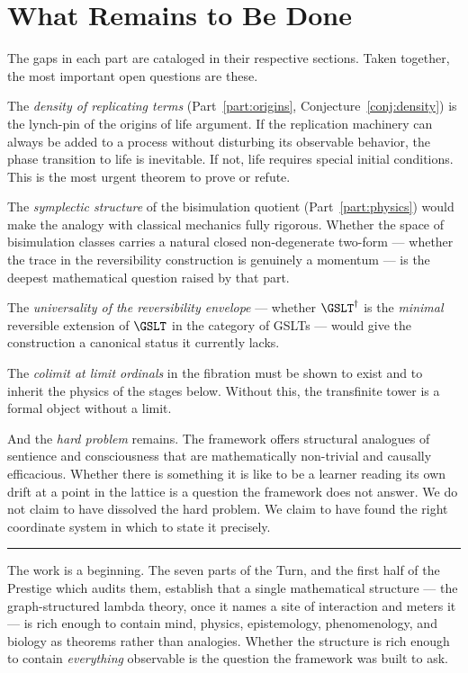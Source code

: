\chapter*{What Remains to Be Done}

The gaps in each part are cataloged in their respective sections.
Taken together, the most important open questions are these.

The \emph{density of replicating terms}
(Part~\ref{part:origins}, Conjecture~\ref{conj:density}) is
the lynch-pin of the origins of life argument.
If the replication machinery can always be added to a process
without disturbing its observable behavior, the phase transition
to life is inevitable.
If not, life requires special initial conditions.
This is the most urgent theorem to prove or refute.

The \emph{symplectic structure} of the bisimulation quotient
(Part~\ref{part:physics}) would make the analogy with classical
mechanics fully
rigorous.
Whether the space of bisimulation classes carries a natural
closed non-degenerate two-form --- whether the trace in the
reversibility construction is genuinely a momentum --- is the
deepest mathematical question raised by that part.

The \emph{universality of the reversibility envelope} --- whether
$\GSLT^\dagger$ is the \emph{minimal} reversible extension of
$\GSLT$ in the category of GSLTs --- would give the construction
a canonical status it currently lacks.

The \emph{colimit at limit ordinals} in the fibration must be
shown to exist and to inherit the physics of the stages below.
Without this, the transfinite tower is a formal object without
a limit.

And the \emph{hard problem} remains.
The framework offers structural analogues of sentience and
consciousness that are mathematically non-trivial and causally
efficacious.
Whether there is something it is like to be a learner reading its
own drift at a point in the lattice is a question the framework
does not answer.
We do not claim to have dissolved the hard problem.
We claim to have found the right coordinate system in which to
state it precisely.

\vspace{2em}
\noindent\hrule
\vspace{1em}

\noindent
The work is a beginning.
The seven parts of the Turn, and the first half of the Prestige which
audits them, establish that a single mathematical structure --- the
graph-structured lambda theory, once it names a site of interaction and
meters it --- is rich enough to contain mind, physics, epistemology,
phenomenology, and biology as theorems rather than analogies.
Whether the structure is rich enough to contain \emph{everything}
observable is the question the framework was built to ask.

